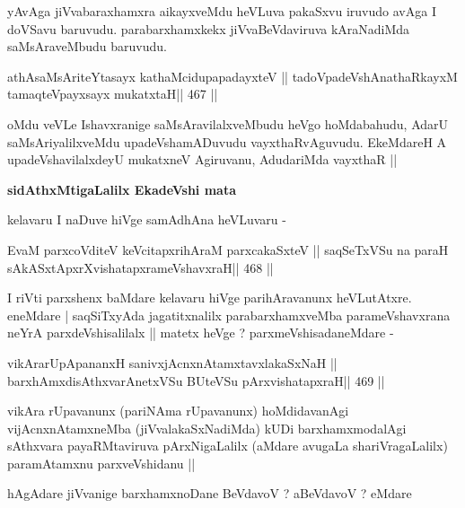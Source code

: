 \begin{artha}
yAvAga jiVvabaraxhamxra aikayxveMdu heVLuva pakaSxvu iruvudo avAga I
doVSavu baruvudu. parabarxhamxkekx jiVvaBeVdaviruva kAraNadiMda
saMsAraveMbudu baruvudu.
\end{artha}

\begin{shl}
athAsaMsAriteYtasayx kathaMcidupapadayxteV ||
tadoVpadeVshAnathaRkayxM tamaqteV\s payxsayx mukatxtaH\hfill || 467 ||
\end{shl}

\begin{artha}
oMdu veVLe Ishavxranige saMsAravilalxveMbudu heVgo hoMdabahudu, AdarU
saMsAriyalilxveMdu upadeVshamADuvudu vayxthaRvAguvudu. EkeMdareH A
upadeVshavilalxdeyU mukatxneV Agiruvanu, AdudariMda vayxthaR ||
\end{artha}

\begin{artha}
{\textbf{sidAthxMtigaLalilx EkadeVshi mata}}

kelavaru I naDuve hiVge samAdhAna heVLuvaru -
\end{artha}

\begin{shl}
EvaM parxcoVditeV keVcitapxrihAraM parxcakaSxteV ||
saqSeTxVSu na paraH sAkASxtApxrXvishatapxrameVshavxraH\hfill || 468 ||
\end{shl}

\begin{artha}
I riVti parxshenx baMdare kelavaru hiVge parihAravanunx
heVLutAtxre. eneMdare | saqSiTxyAda jagatitxnalilx parabarxhamxveMba
parameVshavxrana neYrA parxdeVshisalilalx || matetx heVge ?
parxmeVshisadaneMdare -
\end{artha}

\begin{shl}
vikArarUpApananxH sanivxjAcnxnAtamxtavxlakaSxNaH ||
barxhAmxdisAthxvarAnetxVSu BUteVSu pArxvishatapxraH\hfill || 469 ||
\end{shl}

\begin{artha}
vikAra rUpavanunx (pariNAma rUpavanunx) hoMdidavanAgi
vijAcnxnAtamxneMba (jiVvalakaSxNadiMda) kUDi barxhamxmodalAgi
sAthxvara payaRMtaviruva pArxNigaLalilx (aMdare avugaLa
shariVragaLalilx) paramAtamxnu parxveVshidanu ||
\end{artha}

\begin{artha}
hAgAdare jiVvanige barxhamxnoDane BeVdavoV ? aBeVdavoV ? eMdare
\end{artha}

